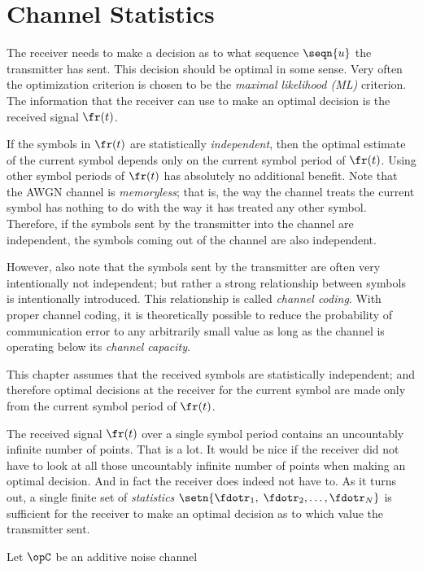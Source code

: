 \section{Channel Statistics}
The receiver needs to make a decision as to what 
sequence $\seqn{u}$ the transmitter has sent.
This decision should be optimal in some sense.
Very often the optimization criterion is chosen to be
the {\em maximal likelihood (ML)} criterion.
The information that the receiver can use to make an optimal 
decision is the received signal $\fr(t)$.

If the symbols in $\fr(t)$ are statistically {\em independent},
then the optimal estimate of the current symbol depends only on the 
current symbol period of $\fr(t)$. 
Using other symbol periods of $\fr(t)$ has absolutely no 
additional benefit. 
Note that the AWGN channel is {\em memoryless};
that is, the way the channel treats the current symbol has
nothing to do with the way it has treated any other symbol.
Therefore, if the symbols sent by the transmitter into the channel
are independent, the symbols coming out of the channel are also 
independent.

However, also note that the symbols sent by the transmitter
are often very intentionally not independent;
but rather a strong relationship between symbols is intentionally 
introduced. This relationship is called {\em channel coding}.
With proper channel coding, it is theoretically possible 
to reduce the probability of communication error to any 
arbitrarily small value as long as the channel is operating below its
{\em channel capacity}.

This chapter assumes that the received symbols are 
statistically independent;
and therefore optimal decisions at the receiver 
for the current symbol are made 
only from the current symbol period of $\fr(t)$.

The received signal $\fr(t)$ over a single symbol period
contains an uncountably infinite number of points.
That is a lot. 
It would be nice if the receiver did not have to look 
at all those uncountably infinite number of points
when making an optimal decision.
And in fact the receiver does indeed not have to.
As it turns out, a single finite set of {\em statistics}
$\setn{\fdotr_1,\;\fdotr_2,\ldots,\fdotr_N}$
is sufficient for the receiver to make an optimal decision as to 
which value the transmitter sent.

\begin{definition}
\label{def:chan_stats}
Let $\opC$ be an additive noise channel 
\end{definition}



